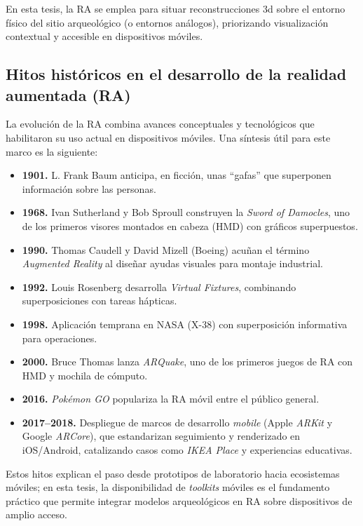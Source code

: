 En esta tesis, la RA se emplea para situar reconstrucciones \gls{3d} sobre el entorno físico del sitio arqueológico (o entornos análogos), priorizando visualización contextual y accesible en dispositivos móviles.


\subsection*{Hitos históricos en el desarrollo de la realidad aumentada (RA)}

La evolución de la RA combina avances conceptuales y tecnológicos que habilitaron su uso actual en dispositivos móviles. Una síntesis útil para este marco es la siguiente:\cite{Onirix2019HistoryAR}
\begin{itemize}
  \item \textbf{1901.} L. Frank Baum anticipa, en ficción, unas “gafas” que superponen información sobre las personas.
  \item \textbf{1968.} Ivan Sutherland y Bob Sproull construyen la \emph{Sword of Damocles}, uno de los primeros visores montados en cabeza (HMD) con gráficos superpuestos.
  \item \textbf{1990.} Thomas Caudell y David Mizell (Boeing) acuñan el término \emph{Augmented Reality} al diseñar ayudas visuales para montaje industrial.
  \item \textbf{1992.} Louis Rosenberg desarrolla \emph{Virtual Fixtures}, combinando superposiciones con tareas hápticas.
  \item \textbf{1998.} Aplicación temprana en NASA (X-38) con superposición informativa para operaciones.
  \item \textbf{2000.} Bruce Thomas lanza \emph{ARQuake}, uno de los primeros juegos de RA con HMD y mochila de cómputo.
  \item \textbf{2016.} \emph{Pokémon GO} populariza la RA móvil entre el público general.
  \item \textbf{2017–2018.} Despliegue de marcos de desarrollo \emph{mobile} (Apple \emph{ARKit} y Google \emph{ARCore}), que estandarizan seguimiento y renderizado en iOS/Android, catalizando casos como \emph{IKEA Place} y experiencias educativas.
\end{itemize}

Estos hitos explican el paso desde prototipos de laboratorio hacia ecosistemas móviles; en esta tesis, la disponibilidad de \emph{toolkits} móviles es el fundamento práctico que permite integrar modelos arqueológicos en RA sobre dispositivos de amplio acceso.

